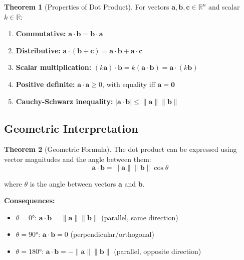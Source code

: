 \documentclass[12pt,a4paper]{article}
\theoremstyle{definition}
\newtheorem{theorem}{Theorem}[section]
\begin{document}
\begin{theorem}[Properties of Dot Product]
For vectors $\mathbf{a}, \mathbf{b}, \mathbf{c} \in \mathbb{R}^n$ and scalar $k \in \mathbb{R}$:

\begin{enumerate}
    \item \textbf{Commutative:} $\mathbf{a} \cdot \mathbf{b} = \mathbf{b} \cdot \mathbf{a}$
    
    \item \textbf{Distributive:} $\mathbf{a} \cdot (\mathbf{b} + \mathbf{c}) = \mathbf{a} \cdot \mathbf{b} + \mathbf{a} \cdot \mathbf{c}$
    
    \item \textbf{Scalar multiplication:} $(k\mathbf{a}) \cdot \mathbf{b} = k(\mathbf{a} \cdot \mathbf{b}) = \mathbf{a} \cdot (k\mathbf{b})$
    
    \item \textbf{Positive definite:} $\mathbf{a} \cdot \mathbf{a} \geq 0$, with equality iff $\mathbf{a} = \mathbf{0}$
    
    \item \textbf{Cauchy-Schwarz inequality:} $|\mathbf{a} \cdot \mathbf{b}| \leq \|\mathbf{a}\| \|\mathbf{b}\|$
\end{enumerate}
\end{theorem}

\subsection{Geometric Interpretation}

\begin{theorem}[Geometric Formula]
The dot product can be expressed using vector magnitudes and the angle between them:
\begin{equation}
\mathbf{a} \cdot \mathbf{b} = \|\mathbf{a}\| \|\mathbf{b}\| \cos \theta
\end{equation}

where $\theta$ is the angle between vectors $\mathbf{a}$ and $\mathbf{b}$.

\textbf{Consequences:}
\begin{itemize}
    \item $\theta = 0°$: $\mathbf{a} \cdot \mathbf{b} = \|\mathbf{a}\| \|\mathbf{b}\|$ (parallel, same direction)
    \item $\theta = 90°$: $\mathbf{a} \cdot \mathbf{b} = 0$ (perpendicular/orthogonal)
    \item $\theta = 180°$: $\mathbf{a} \cdot \mathbf{b} = -\|\mathbf{a}\| \|\mathbf{b}\|$ (parallel, opposite direction)
\end{itemize}
\end{theorem}
\end{document}
